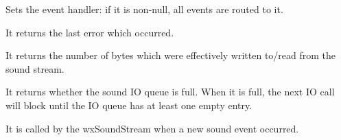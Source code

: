 
Sets the event handler: if it is non-null, all events are routed to it.

\label{wxsoundstreamgeterror}


It returns the last error which occurred.

\label{wxsoundstreamgetlastaccess}


It returns the number of bytes which were effectively written to/read from the sound stream.

\label{wxsoundstreamqueuefilled}


It returns whether the sound IO queue is full. When it is full, the next IO call will block
until the IO queue has at least one empty entry.

\label{wxsoundstreamonsoundevent}


It is called by the wxSoundStream when a new sound event occurred.

